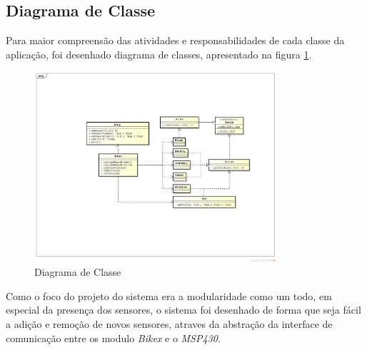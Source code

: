 
\subsection{Diagrama de Classe} %
\label{sec:diagrama_de_classe}

Para maior compreensão das atividades e responsabilidades de cada classe da aplicação, foi desenhado %
diagrama de classes, apresentado na figura \ref{fig:diagrama-classe}.

\begin{figure}[h]
  \centering
	\includegraphics[width=0.8\textwidth]{figuras/class_diagram}
  \caption{Diagrama de Classe}
  \label{fig:diagrama-classe}
\end{figure}

Como o foco do projeto do sistema era a modularidade como um todo, em especial da presença dos sensores, o sistema foi desenhado de forma que seja fácil a adição e remoção de novos sensores, atraves da abstração da interface de comunicação entre os modulo \textit{Bikex} e o \textit{MSP430}.


